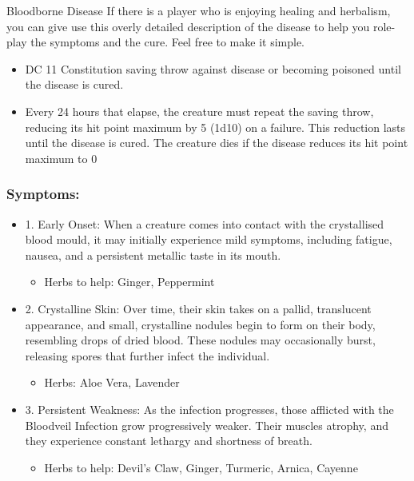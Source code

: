 \documentclass[10pt,onecolumn,twoside,openany,bg=full,layout=true]{dndbook}
\begin{document}
\begin{DndComment}{Bloodborne Disease}
If there is a player who is enjoying healing and herbalism, you can give use this overly detailed description of the disease to help you role-play the symptoms and the cure.
Feel free to make it simple.
\begin{itemize}
\item DC 11 Constitution saving throw against disease or becoming poisoned until the disease is cured.
\item Every 24 hours that elapse, the creature must repeat the saving throw, reducing its hit point maximum by 5 (1d10) on a failure.
This reduction lasts until the disease is cured.
The creature dies if the disease reduces its hit point maximum to 0
\end{itemize}

\subsubsection*{Symptoms:}
\begin{itemize}
  \item 1. Early Onset: When a creature comes into contact with the crystallised blood mould, it may initially experience mild symptoms, including fatigue, nausea, and a persistent metallic taste in its mouth.
    \begin{itemize}
      \item Herbs to help: Ginger, Peppermint
    \end{itemize}

  \item 2. Crystalline Skin: Over time, their skin takes on a pallid, translucent appearance, and small, crystalline nodules begin to form on their body, resembling drops of dried blood. These nodules may occasionally burst, releasing spores that further infect the individual.
    \begin{itemize}
      \item Herbs: Aloe Vera, Lavender
    \end{itemize}

  \item 3. Persistent Weakness: As the infection progresses, those afflicted with the Bloodveil Infection grow progressively weaker. Their muscles atrophy, and they experience constant lethargy and shortness of breath.
    \begin{itemize}
      \item Herbs to help: Devil's Claw, Ginger, Turmeric, Arnica, Cayenne
    \end{itemize}


\end{itemize}
\end{DndComment}
\end{document}
